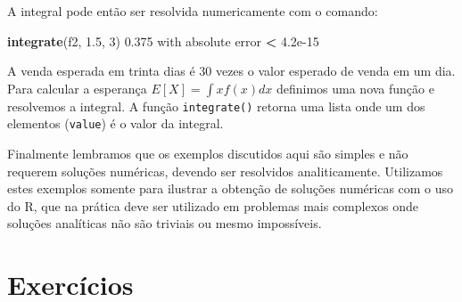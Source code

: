 \documentclass[10pt,a4paper]{book}
\newenvironment{Shaded}{\begin{snugshade}}{\end{snugshade}}
\newcommand{\KeywordTok}[1]{\textcolor[rgb]{0.13,0.29,0.53}{\textbf{#1}}}
\newcommand{\DecValTok}[1]{\textcolor[rgb]{0.00,0.00,0.81}{#1}}
\newcommand{\FloatTok}[1]{\textcolor[rgb]{0.00,0.00,0.81}{#1}}
\newcommand{\StringTok}[1]{\textcolor[rgb]{0.31,0.60,0.02}{#1}}
\newcommand{\ControlFlowTok}[1]{\textcolor[rgb]{0.13,0.29,0.53}{\textbf{#1}}}
\newcommand{\OperatorTok}[1]{\textcolor[rgb]{0.81,0.36,0.00}{\textbf{#1}}}
\newcommand{\NormalTok}[1]{#1}
\begin{document}
A integral pode então ser resolvida numericamente com o comando:

\begin{Shaded}
\begin{Highlighting}[]
\KeywordTok{integrate}\NormalTok{(f2, }\FloatTok{1.5}\NormalTok{, }\DecValTok{3}\NormalTok{)}
\FloatTok{0.375}\NormalTok{ with absolute error }\OperatorTok{<}\StringTok{ }\FloatTok{4.2e-15}
\end{Highlighting}
\end{Shaded}

A venda esperada em trinta dias é 30 vezes o valor esperado de venda em
um dia. Para calcular a esperança \(E[X] = \int x f(x) dx\) definimos
uma nova função e resolvemos a integral. A função \texttt{integrate()}
retorna uma lista onde um dos elementos (\texttt{value}) é o valor da
integral.

\begin{Shaded}
\end{Shaded}

Finalmente lembramos que os exemplos discutidos aqui são simples e não
requerem soluções numéricas, devendo ser resolvidos analiticamente.
Utilizamos estes exemplos somente para ilustrar a obtenção de soluções
numéricas com o uso do R, que na prática deve ser utilizado em problemas
mais complexos onde soluções analíticas não são triviais ou mesmo
impossíveis.

\section*{Exercícios}\label{exercuxedcios-16}
\end{document}
